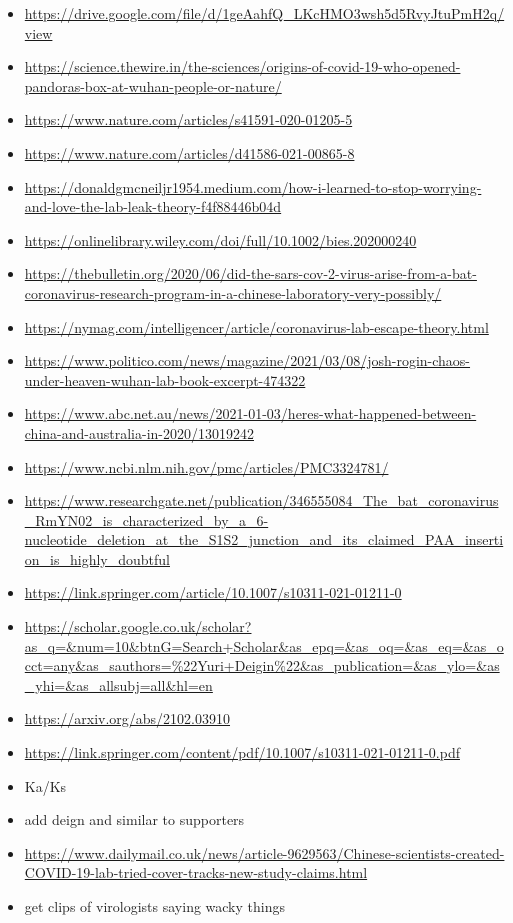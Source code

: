 \documentclass[11pt]{article}
\begin{document}
\begin{itemize}
\item \url{https://drive.google.com/file/d/1geAahfQ\_LKcHMO3wsh5d5RvyJtuPmH2q/view}
\item \url{https://science.thewire.in/the-sciences/origins-of-covid-19-who-opened-pandoras-box-at-wuhan-people-or-nature/}
\item \url{https://www.nature.com/articles/s41591-020-01205-5}
\item \url{https://www.nature.com/articles/d41586-021-00865-8}
\item \url{https://donaldgmcneiljr1954.medium.com/how-i-learned-to-stop-worrying-and-love-the-lab-leak-theory-f4f88446b04d}
\item \url{https://onlinelibrary.wiley.com/doi/full/10.1002/bies.202000240}
\item \url{https://thebulletin.org/2020/06/did-the-sars-cov-2-virus-arise-from-a-bat-coronavirus-research-program-in-a-chinese-laboratory-very-possibly/}
\item \url{https://nymag.com/intelligencer/article/coronavirus-lab-escape-theory.html}
\item \url{https://www.politico.com/news/magazine/2021/03/08/josh-rogin-chaos-under-heaven-wuhan-lab-book-excerpt-474322}
\item \url{https://www.abc.net.au/news/2021-01-03/heres-what-happened-between-china-and-australia-in-2020/13019242}
\item \url{https://www.ncbi.nlm.nih.gov/pmc/articles/PMC3324781/}
\item \url{https://www.researchgate.net/publication/346555084\_The\_bat\_coronavirus\_RmYN02\_is\_characterized\_by\_a\_6-nucleotide\_deletion\_at\_the\_S1S2\_junction\_and\_its\_claimed\_PAA\_insertion\_is\_highly\_doubtful}
\item \url{https://link.springer.com/article/10.1007/s10311-021-01211-0}
\item \url{https://scholar.google.co.uk/scholar?as\_q=\&num=10\&btnG=Search+Scholar\&as\_epq=\&as\_oq=\&as\_eq=\&as\_occt=any\&as\_sauthors=\%22Yuri+Deigin\%22\&as\_publication=\&as\_ylo=\&as\_yhi=\&as\_allsubj=all\&hl=en}
\item \url{https://arxiv.org/abs/2102.03910}
\item \url{https://link.springer.com/content/pdf/10.1007/s10311-021-01211-0.pdf}
\item Ka/Ks
\item add deign and similar to supporters
\item \url{https://www.dailymail.co.uk/news/article-9629563/Chinese-scientists-created-COVID-19-lab-tried-cover-tracks-new-study-claims.html}
\item get clips of virologists saying wacky things
\end{itemize}
\end{document}
